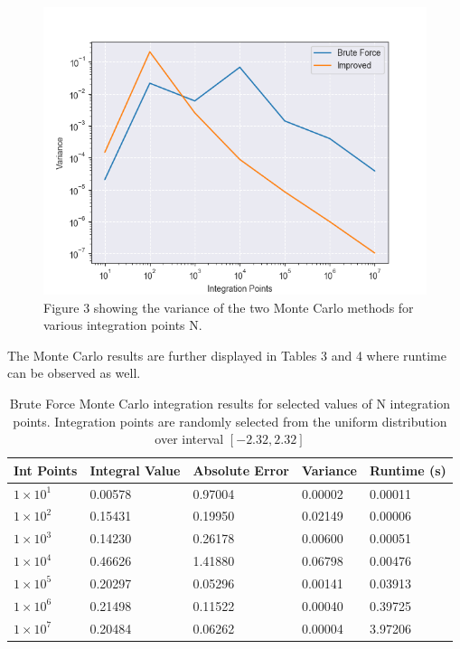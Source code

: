 \documentclass{emulateapj}
\begin{document}
\begin{figure}[H]
    \centering
    \includegraphics[scale=0.5]{montevariance.png}
    \caption{Figure 3 showing the variance of the two Monte Carlo methods for various integration points N.}
    \label{fig:fig3}
\end{figure}
The Monte Carlo results are further displayed in Tables 3 and 4 where runtime can be observed as well.
\begin{table}[H]
\caption{Brute Force Monte Carlo integration results for selected values of N integration points. Integration points are randomly selected from the uniform distribution over interval $[-2.32,2.32]$}
\label{tab:table2}
\begin{ruledtabular}
\begin{tabular}{p{1.3cm} p{1.5cm} p{1.5cm}p{1.5cm} p{1.5cm} }
Int Points & Integral Value & Absolute Error & Variance & Runtime (s)\\
\hline
 $1\times10^{1}$ & 0.00578 & 0.97004 & 0.00002 & 0.00011\\
 $1\times10^{2}$ & 0.15431 & 0.19950 & 0.02149 & 0.00006\\
 $1\times10^{3}$ & 0.14230 & 0.26178 & 0.00600 & 0.00051\\
 $1\times10^{4}$ & 0.46626 & 1.41880 & 0.06798 & 0.00476\\
 $1\times10^{5}$ & 0.20297 & 0.05296 & 0.00141 & 0.03913\\
 $1\times10^{6}$ & 0.21498 & 0.11522 & 0.00040 & 0.39725\\
 $1\times10^{7}$ & 0.20484 & 0.06262 & 0.00004 & 3.97206\\
\end{tabular}
\end{ruledtabular}
\end{table}
\end{document}
